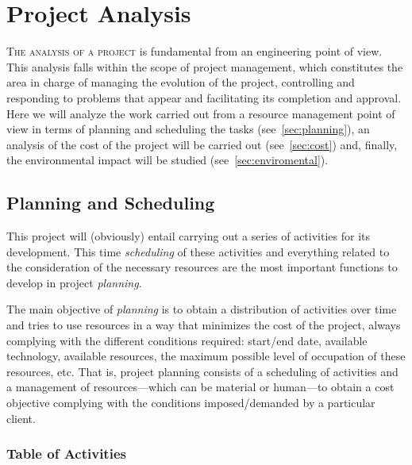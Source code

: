 

\chapter{Project Analysis}\label{cha:analysis}



\lettrine{T}{he analysis of a project} is fundamental from an engineering point
of view. This analysis falls within the scope of project management, which
constitutes the area in charge of managing the evolution of the project,
controlling and responding to problems that appear and facilitating its
completion and approval. Here we will analyze the work carried out from a
resource management point of view in terms of planning and scheduling the tasks
(see\ \vref{sec:planning}), an analysis of the cost of the project will be
carried out (see\ \vref{sec:cost}) and, finally, the environmental impact will
be studied (see\ \vref{sec:enviromental}).



\section{Planning and Scheduling}%
\label{sec:planning}

This project will (obviously) entail carrying out a series of activities for
its development. This time \emph{scheduling} of these activities and everything
related to the consideration of the necessary resources are the most important
functions to develop in project \emph{planning}.

The main objective of \emph{planning} is to obtain a distribution of activities
over time and tries to use resources in a way that minimizes the cost of the
project, always complying with the different conditions required: start/end
date, available technology, available resources, the maximum possible level of
occupation of these resources, etc. That is, project planning consists of a
scheduling of activities and a management of resources---which can be material
or human---to obtain a cost objective complying with the conditions
imposed/demanded by a particular client.


\subsection{Table of Activities}\label{sec:activities}

